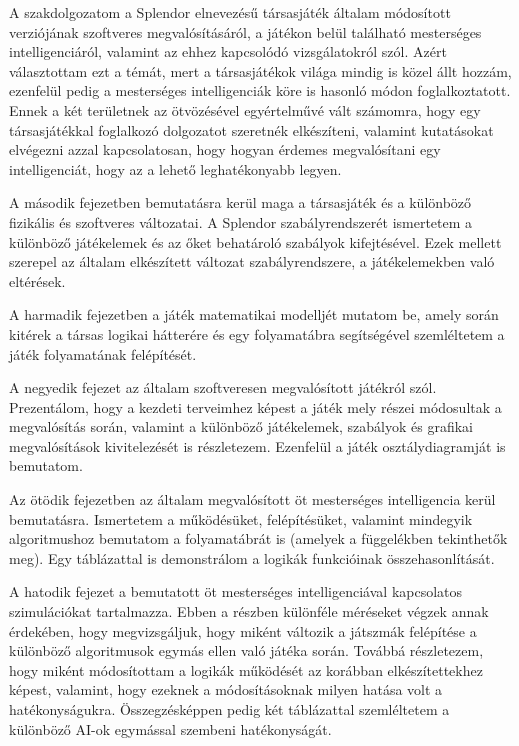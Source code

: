 
A szakdolgozatom a Splendor elnevezésű társasjáték általam módosított verziójának szoftveres megvalósításáról, a játékon belül található mesterséges intelligenciáról, valamint az ehhez kapcsolódó vizsgálatokról szól. Azért választottam ezt a témát, mert a társasjátékok világa mindig is közel állt hozzám, ezenfelül pedig a mesterséges intelligenciák köre is hasonló módon foglalkoztatott. Ennek a két területnek az ötvözésével egyértelművé vált számomra, hogy egy társasjátékkal foglalkozó dolgozatot szeretnék elkészíteni, valamint kutatásokat elvégezni azzal kapcsolatosan, hogy hogyan érdemes megvalósítani egy intelligenciát, hogy az a lehető leghatékonyabb legyen.

A második fejezetben bemutatásra kerül maga a társasjáték és a különböző fizikális és szoftveres változatai. A Splendor szabályrendszerét ismertetem a különböző játékelemek és az őket behatároló szabályok kifejtésével. Ezek mellett szerepel az általam elkészített változat szabályrendszere, a játékelemekben való eltérések.

A harmadik fejezetben a játék matematikai modelljét mutatom be, amely során kitérek a társas logikai hátterére és egy folyamatábra segítségével szemléltetem a játék folyamatának felépítését.

A negyedik fejezet az általam szoftveresen megvalósított játékról szól. Prezentálom, hogy a kezdeti terveimhez képest a játék mely részei módosultak a megvalósítás során, valamint a különböző játékelemek, szabályok és grafikai megvalósítások kivitelezését is részletezem. Ezenfelül a játék osztálydiagramját is bemutatom.

Az ötödik fejezetben az általam megvalósított öt mesterséges intelligencia kerül bemutatásra. Ismertetem a működésüket, felépítésüket, valamint mindegyik algoritmushoz bemutatom a folyamatábrát is (amelyek a függelékben tekinthetők meg). Egy táblázattal is demonstrálom a logikák funkcióinak összehasonlítását.

A hatodik fejezet a bemutatott öt mesterséges intelligenciával kapcsolatos szimulációkat tartalmazza. Ebben a részben különféle méréseket végzek annak érdekében, hogy megvizsgáljuk, hogy miként változik a játszmák felépítése a különböző algoritmusok egymás ellen való játéka során. Továbbá részletezem, hogy miként módosítottam a logikák működését az korábban elkészítettekhez képest, valamint, hogy ezeknek a módosításoknak milyen hatása volt a hatékonyságukra. Összegzésképpen pedig két táblázattal szemléltetem a különböző AI-ok egymással szembeni hatékonyságát.